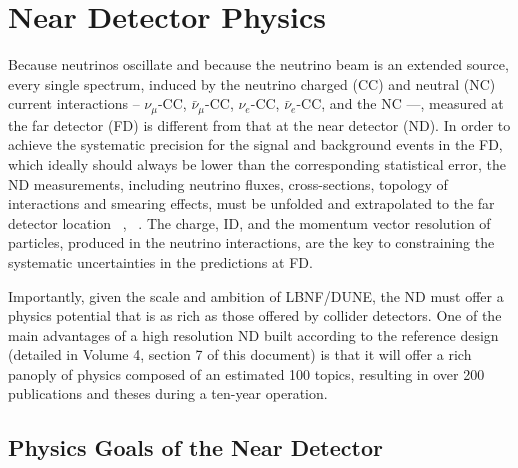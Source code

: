 

\chapter{Near Detector Physics}
\label{ch:physics-nd}

Because neutrinos oscillate and because the neutrino beam is an extended  source, every single 
spectrum,  induced by the neutrino charged (CC) and neutral (NC) current interactions -- $\nu_\mu$-CC, 
$\bar \nu_\mu$-CC, $\nu_e$-CC, $\bar \nu_e$-CC, and the NC ---, measured at the far detector (FD)  is different from that at the near 
detector (ND). 
In order to achieve the systematic precision for the signal and background events  in the FD,  
which ideally should always be lower than the corresponding statistical error, the ND 
measurements,  including neutrino fluxes,  cross-sections, topology of 
interactions and smearing effects, must be unfolded and extrapolated to the far detector location 
~\cite{ND-REQ1}, ~\cite{ND-REQ2}.  The charge, ID,  and the momentum vector resolution of 
particles, produced in the neutrino interactions,  are the key to constraining  the systematic 
uncertainties in the predictions at FD. 


Importantly, given the scale and ambition of LBNF/DUNE, the ND must offer a physics 
potential that is as rich as those offered by collider detectors. 
One of the main advantages of a high resolution ND built according to the reference design 
(detailed in Volume 4, section 7 of  this document) is that it will offer a rich panoply of physics composed 
of an estimated 100 topics,  resulting in over 200 publications and  theses during a ten-year operation. 


\section{Physics Goals of the Near Detector}
\label{sec:physics-nd-goals}

